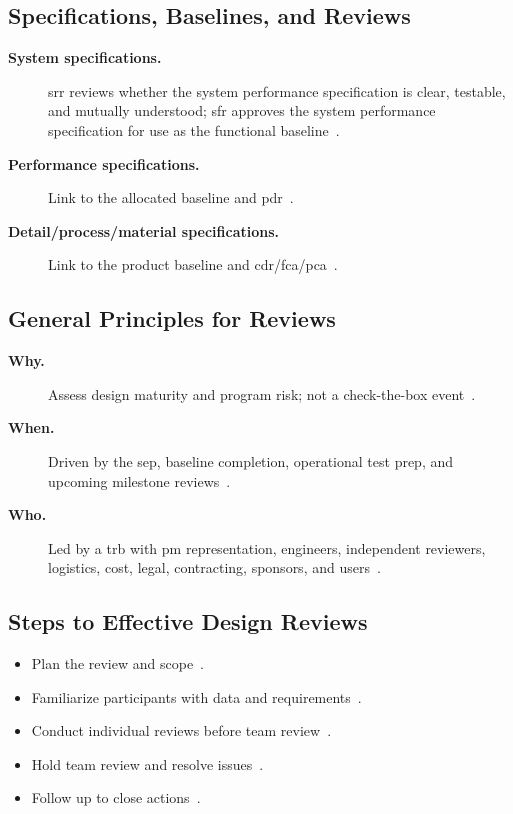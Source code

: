\documentclass[../main.tex]{subfiles}
\begin{document}
\subsection{Specifications, Baselines, and Reviews}
\begin{description}
  \item[\textbf{System specifications.}] \ac{srr} reviews whether the system performance specification is clear, testable, and mutually understood; \ac{sfr} approves the system performance specification for use as the functional baseline~\autocite{edo-3-5-3-cm-tech-reviews-2025,DAU-System-Requirements-Review,DAU-System-Functional-Review,DAU-System-Performance-Specification}.
  \item[\textbf{Performance specifications.}] Link to the allocated baseline and \ac{pdr}~\autocite{edo-3-5-3-cm-tech-reviews-2025,DAU-Allocated-Baseline,DAU-Preliminary-Design-Review}.
  \item[\textbf{Detail/process/material specifications.}] Link to the product baseline and \ac{cdr}/\ac{fca}/\ac{pca}~\autocite{edo-3-5-3-cm-tech-reviews-2025,DAU-Product-Baseline,DAU-Critical-Design-Review}.
\end{description}

\subsection{General Principles for Reviews}
\begin{description}
  \item[\textbf{Why.}] Assess design maturity and program risk; not a check-the-box event~\autocite{edo-3-5-3-cm-tech-reviews-2025}.
  \item[\textbf{When.}] Driven by the \ac{sep}, baseline completion, operational test prep, and upcoming milestone reviews~\autocite{edo-3-5-3-cm-tech-reviews-2025}.
  \item[\textbf{Who.}] Led by a \ac{trb} with \ac{pm} representation, engineers, independent reviewers, logistics, cost, legal, contracting, sponsors, and users~\autocite{edo-3-5-3-cm-tech-reviews-2025}.
\end{description}

\subsection{Steps to Effective Design Reviews}
\begin{itemize}
  \item Plan the review and scope~\autocite{edo-3-5-3-cm-tech-reviews-2025}.
  \item Familiarize participants with data and requirements~\autocite{edo-3-5-3-cm-tech-reviews-2025}.
  \item Conduct individual reviews before team review~\autocite{edo-3-5-3-cm-tech-reviews-2025}.
  \item Hold team review and resolve issues~\autocite{edo-3-5-3-cm-tech-reviews-2025}.
  \item Follow up to close actions~\autocite{edo-3-5-3-cm-tech-reviews-2025}.
\end{itemize}
\end{document}
